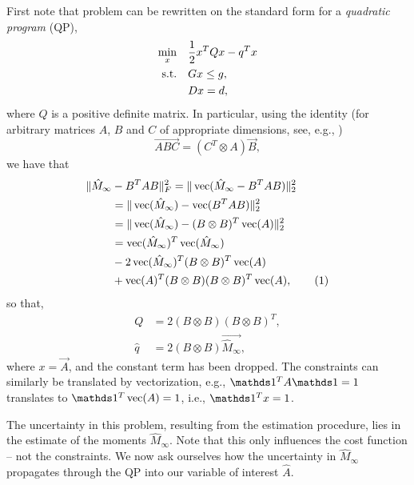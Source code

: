 \documentclass[journal]{IEEEtran}
\newcommand{\hMii}{\hat M_\infty}
\begin{document}
First note that problem  can be rewritten on the standard
form for a \emph{quadratic program} (QP),
\begin{align}
    \min_x \quad & \frac{1}{2} x^T Q x - q^T x \notag \\
    \text{s.t.} \quad & Gx \leq g,  \notag \\
                      & Dx = d,
    \label{eq:nominal_QP}
\end{align}
where $Q$ is a positive definite matrix. In particular, using the
identity (for arbitrary matrices $A$, $B$ and $C$ of appropriate dimensions, see, e.g.,
\cite{horn_topics_1991}) %
\begin{equation}
    \vec{ABC} = (C^T \otimes A) \vec{B},
\end{equation}
we have that 
\begin{align*}
    \| \hat M_\infty &- B^T A B \|_F^2 = \| \vec{\hMii - B^T A B} \|_2^2 \\
                                      &= \| \vec{\hMii} - \vec{B^T AB} \|_2^2 \\
                                      &= \| \vec{\hMii} - (B \otimes B)^T \vec{A} \|_2^2 \\
                                      &= \vec{\hMii}^T \vec{\hMii} \\
                                      &- 2 \vec{\hMii}^T (B \otimes B)^T \vec{A} \\
                                      &+ \vec{A}^T (B \otimes B) (B
    \otimes B)^T \vec{A}, \stepcounter{equation}\tag{\theequation}
    \label{eq:vectorization_of_cost}
\end{align*}
so that,
\begin{align}
    Q &= 2 (B \otimes B) (B \otimes B)^T, \\
    \hat q &= 2 (B \otimes B) \vec{\hMii},
\end{align}
where $x = \vec{A}$, and the constant term has been dropped. The constraints can
similarly be translated by vectorization, e.g., $\ones^T A \ones = 1$
translates to $\ones^T \vec{A} = 1$, i.e., $\ones^T x = 1$.

The uncertainty in this problem, resulting from the estimation procedure, lies
in the estimate of the moments $\hMii$. Note that this only influences the cost
function -- not the constraints. We now ask ourselves how the uncertainty in
$\hMii$ propagates through the QP into our variable of interest $\hat A$.
\end{document}
